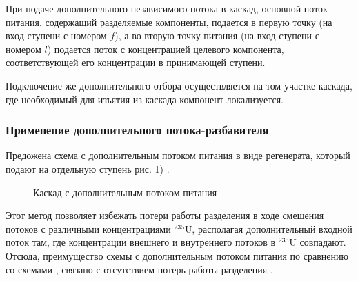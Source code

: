 При подаче дополнительного независимого потока в каскад, основной поток питания, содержащий разделяемые компоненты, подается в первую точку (на вход ступени с
номером $f$), а во вторую точку питания (на вход ступени с номером
$l$) подается поток с концентрацией целевого компонента, соответствующей его концентрации в принимающей ступени.

Подключение же дополнительного отбора осуществляется на том участке каскада, где необходимый для изъятия из каскада компонент локализуется.

\subsubsection{Применение дополнительного потока-разбавителя}

Предожена схема с дополнительным потоком питания в виде регенерата, который подают на отдельную ступень рис. \ref{fig:2_inputs}) \cite{sulaberidzeQuasiidealCascadesAdditional2006}.
\begin{figure}[ht]
  \caption{Каскад с дополнительным потоком питания}\label{fig:2_inputs}
\end{figure}

Этот метод позволяет избежать потери работы разделения в ходе смешения потоков с различными концентрациями $^{235}$U, располагая дополнительный входной поток там, где концентрации внешнего и внутреннего потоков в $^{235}$U совпадают.
Отсюда, преимущество схемы с дополнительным потоком питания по сравнению со схемами , связано с отсутствием потерь работы разделения \cite{smirnovKaskadnyeShemyZadachah2012, sulaberidzeQuasiidealCascadesAdditional2006}.

